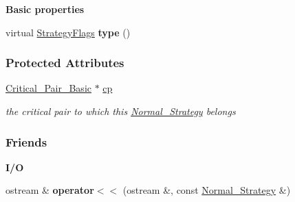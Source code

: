 \begin{Indent}\textbf{ Basic properties}\par
\begin{DoxyCompactItemize}
\item 
\mbox{\label{group__strategygroup_a5ec1a6aa131857892894a12a623f37f9}} 
virtual \hyperlink{group__strategygroup_ga0ee6c8e033547330e6b89929730007f4}{Strategy\+Flags} {\bfseries type} ()
\end{DoxyCompactItemize}
\end{Indent}
\subsubsection*{Protected Attributes}
\begin{DoxyCompactItemize}
\item 
\mbox{\label{group__strategygroup_aac4e370079c1b86ee307c0e400110925}} 
\hyperlink{group___g_b_computation_class_critical___pair___basic}{Critical\+\_\+\+Pair\+\_\+\+Basic} $\ast$ \hyperlink{group__strategygroup_aac4e370079c1b86ee307c0e400110925}{cp}
\begin{DoxyCompactList}\small\item\em the critical pair to which this {\ttfamily \hyperlink{group__strategygroup_class_normal___strategy}{Normal\+\_\+\+Strategy}} belongs \end{DoxyCompactList}\end{DoxyCompactItemize}
\subsubsection*{Friends}
\begin{Indent}\textbf{ I/O}\par
\begin{DoxyCompactItemize}
\item 
\mbox{\label{group__strategygroup_a735354f98e00c89dd87f890d65c984aa}} 
ostream \& {\bfseries operator$<$$<$} (ostream \&, const \hyperlink{group__strategygroup_class_normal___strategy}{Normal\+\_\+\+Strategy} \&)
\end{DoxyCompactItemize}
\end{Indent}
\label{class_pair___strategy___data}
